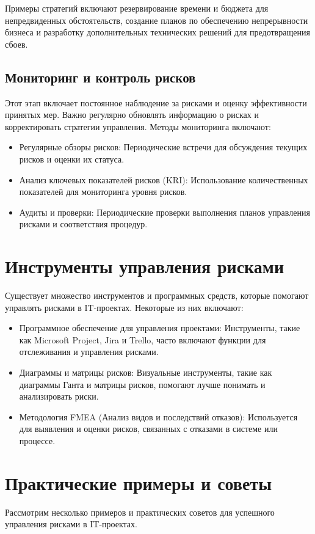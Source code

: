     Примеры стратегий включают резервирование времени и бюджета для непредвиденных обстоятельств, создание планов по обеспечению непрерывности бизнеса и разработку дополнительных технических решений для предотвращения сбоев.

    \subsection{Мониторинг и контроль рисков}
    Этот этап включает постоянное наблюдение за рисками и оценку эффективности принятых мер. Важно регулярно обновлять информацию о рисках и корректировать стратегии управления. Методы мониторинга включают:

    \begin{itemize}
        \item Регулярные обзоры рисков: Периодические встречи для обсуждения текущих рисков и оценки их статуса.
        \item Анализ ключевых показателей рисков (KRI): Использование количественных показателей для мониторинга уровня рисков.
        \item Аудиты и проверки: Периодические проверки выполнения планов управления рисками и соответствия процедур.
    \end{itemize}

    \section{Инструменты управления рисками}
    Существует множество инструментов и программных средств, которые помогают управлять рисками в IT-проектах. Некоторые из них включают:

    \begin{itemize}
        \item Программное обеспечение для управления проектами: Инструменты, такие как Microsoft Project, Jira и Trello, часто включают функции для отслеживания и управления рисками.
        \item Диаграммы и матрицы рисков: Визуальные инструменты, такие как диаграммы Ганта и матрицы рисков, помогают лучше понимать и анализировать риски.
        \item Методология FMEA (Анализ видов и последствий отказов): Используется для выявления и оценки рисков, связанных с отказами в системе или процессе.
    \end{itemize}

    \section{Практические примеры и советы}
    Рассмотрим несколько примеров и практических советов для успешного управления рисками в IT-проектах.

